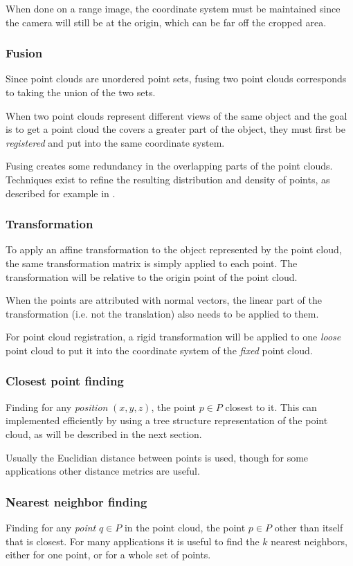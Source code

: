 When done on a range image, the coordinate system must be maintained since the camera will still be at the origin, which can be far off the cropped area.

\subsubsection{Fusion}
Since point clouds are unordered point sets, fusing two point clouds corresponds to taking the union of the two sets.

When two point clouds represent different views of the same object and the goal is to get a point cloud the covers a greater part of the object, they must first be \emph{registered} and put into the same coordinate system.

Fusing creates some redundancy in the overlapping parts of the point clouds. Techniques exist to refine the resulting distribution and density of points, as described for example in \cite{Kyos2013}.


\subsubsection{Transformation}
To apply an affine transformation to the object represented by the point cloud, the same transformation matrix is simply applied to each point. The transformation will be relative to the origin point of the point cloud.

When the points are attributed with normal vectors, the linear part of the transformation (i.e. not the translation) also needs to be applied to them.

For point cloud registration, a rigid transformation will be applied to one \emph{loose} point cloud to put it into the coordinate system of the \emph{fixed} point cloud.


\subsubsection{Closest point finding}
Finding for any \emph{position} $(x, y, z)$, the point $p \in P$ closest to it. This can implemented efficiently by using a tree structure representation of the point cloud, as will be described in the next section.

Usually the Euclidian distance between points is used, though for some applications other distance metrics are useful.

\subsubsection{Nearest neighbor finding}
Finding for any \emph{point} $q \in P$ in the point cloud, the point $p \in P$ other than itself that is closest. For many applications it is useful to find the $k$ nearest neighbors, either for one point, or for a whole set of points.

